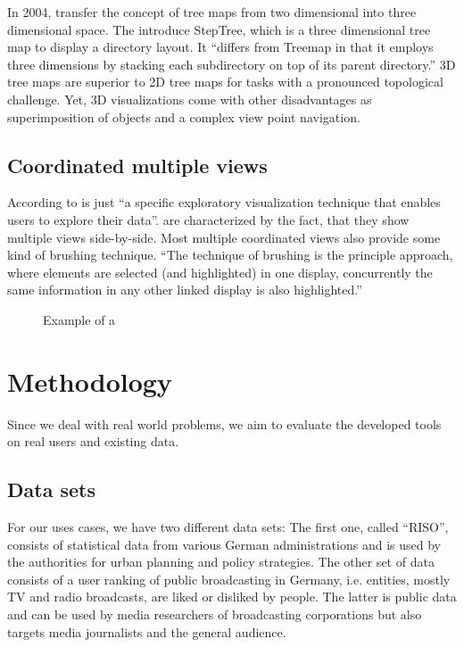 \documentclass{article}
\begin{document}
In 2004, \textcite{Bladh2004} transfer the concept of tree maps from two dimensional into three dimensional space.
The introduce StepTree, which is a three dimensional tree map to display a directory layout.
It ``differs from Treemap in that it employs three dimensions by stacking each subdirectory on top of its parent directory.''\cite{Bladh2004}
3D tree maps are superior to 2D tree maps for tasks with a pronounced topological challenge.
Yet, 3D visualizations come with other disadvantages as superimposition of objects and a complex view point navigation.


\subsection{Coordinated multiple views}
According to \textcite{Roberts2007} \cmvs{} is just ``a specific exploratory visualization technique that enables users to explore their data''.
\cmvs{} are characterized by the fact, that they show multiple views side-by-side.
Most multiple coordinated views also provide some kind of brushing technique.
``The technique of brushing is the principle approach, where elements are selected (and highlighted) in one display, concurrently the same information in any other linked display is also highlighted.''\cite{Roberts2007}

\begin{figure}[h]
\centering
\caption{Example of a \cmvs{}}
\label{fig:research:cmv}
\end{figure}

\section{Methodology}

Since we deal with real world problems, we aim to evaluate the developed tools on real users and existing data.

\subsection{Data sets}
For our uses cases, we have two different data sets:
The first one, called ``RISO'', consists of statistical data from various German administrations and is used by the authorities for urban planning and policy strategies.
The other set of data consists of a user ranking of public broadcasting in Germany, i.e. entities, mostly TV and radio broadcasts, are liked or disliked by people.
The latter is public data and can be used by media researchers of broadcasting corporations but also targets media journalists and the general audience.
\end{document}
